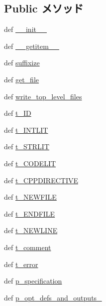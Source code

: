 \subsection*{Public メソッド}
\begin{DoxyCompactItemize}
\item 
def \hyperlink{classisa__parser_1_1ISAParser_ac775ee34451fdfa742b318538164070e}{\_\-\_\-init\_\-\_\-}
\item 
def \hyperlink{classisa__parser_1_1ISAParser_a50d766f4276c3d8fe330ac8cd344a75f}{\_\-\_\-getitem\_\-\_\-}
\item 
def \hyperlink{classisa__parser_1_1ISAParser_ae64975085e347e14529262c22d4256a9}{suffixize}
\item 
def \hyperlink{classisa__parser_1_1ISAParser_a6ac21a60543e62e29cd947a8e9af0424}{get\_\-file}
\item 
def \hyperlink{classisa__parser_1_1ISAParser_ad4faa0dfb91cd69dfc8f3a19f3fafd82}{write\_\-top\_\-level\_\-files}
\item 
def \hyperlink{classisa__parser_1_1ISAParser_a9466cde47ec1f3f6a3f63f4c532198e6}{t\_\-ID}
\item 
def \hyperlink{classisa__parser_1_1ISAParser_a8f388de6dbecec81beb34803661a82df}{t\_\-INTLIT}
\item 
def \hyperlink{classisa__parser_1_1ISAParser_af152d0eadd5e6f041614468a98132120}{t\_\-STRLIT}
\item 
def \hyperlink{classisa__parser_1_1ISAParser_afb138ccaad9cf7e165fba0534632b853}{t\_\-CODELIT}
\item 
def \hyperlink{classisa__parser_1_1ISAParser_a61f41a31e496510965d58890bc2d3ab4}{t\_\-CPPDIRECTIVE}
\item 
def \hyperlink{classisa__parser_1_1ISAParser_a74a40c060eef7777d3b86c30a17bba90}{t\_\-NEWFILE}
\item 
def \hyperlink{classisa__parser_1_1ISAParser_a5272542b32a0e4d0d6e98e71b835c5a2}{t\_\-ENDFILE}
\item 
def \hyperlink{classisa__parser_1_1ISAParser_a569a03408bcf75d707d2b8886066e9a3}{t\_\-NEWLINE}
\item 
def \hyperlink{classisa__parser_1_1ISAParser_a2592fbdb5931e5f4892aca82a0833bae}{t\_\-comment}
\item 
def \hyperlink{classisa__parser_1_1ISAParser_aa36cfdc4c544b59202ebc57d37d62a31}{t\_\-error}
\item 
def \hyperlink{classisa__parser_1_1ISAParser_ab00ad4dda9edefa214154bff3d217fc3}{p\_\-specification}
\item 
def \hyperlink{classisa__parser_1_1ISAParser_a698409d13c0ca38fa38cbdbaf265832d}{p\_\-opt\_\-defs\_\-and\_\-outputs\_}

\end{DoxyCompactItemize}
